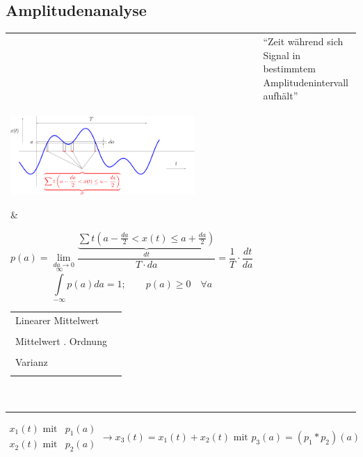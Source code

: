 \subsection{Amplitudenanalyse }
\begin{tabular}{ll}
	& ``Zeit während sich Signal in bestimmtem Amplitudenintervall aufhält'' \\
\parbox{7cm}{
	\includegraphics[width=7cm]{./bilder/amplitudenanalyse.png}
	}
	& \begin{minipage}[]{11cm}
			$$p(a) = \lim_{da\rightarrow 0}\frac{\underbrace{\sum t\left(
			a-\frac{da}{2}<x(t)\leq a+\frac{da}{2}\right)}_{dt}}{T\cdot da} = \frac{1}{T}\cdot
			\frac{dt}{da}$$
			$$\int\limits_{-\infty}^{\infty} p(a) da = 1; \qquad p(a) \geq 0  \quad \forall a$$
			
			\begin{tabular}{ll}
            Linearer Mittelwert 
            	& \fbox{$X_0  = \int\limits_{-\infty}^{\infty}a\cdot p(a)da$} \\ \\ 
            Mittelwert $n$. Ordnung 
            	& \fbox{$X^n = \int\limits_{-\infty}^{\infty}a^n\cdot p(a)da$} \\ \\
						Varianz
							& \fbox{$Var(x) = \int\limits_{-\infty}^{\infty}(a-X_0)^2\cdot p(a) da$} \\ \\
            \end{tabular}
      \end{minipage} \\
\end{tabular}

$\begin{array}{ll}
	x_1(t) \text{ mit} & p_1(a) \\
	x_2(t) \text{ mit} & p_2(a)
\end{array} 
\rightarrow x_3(t) = x_1(t) + x_2(t) \text{ mit } p_3(a) = (p_1 \ast p_2)(a)$


